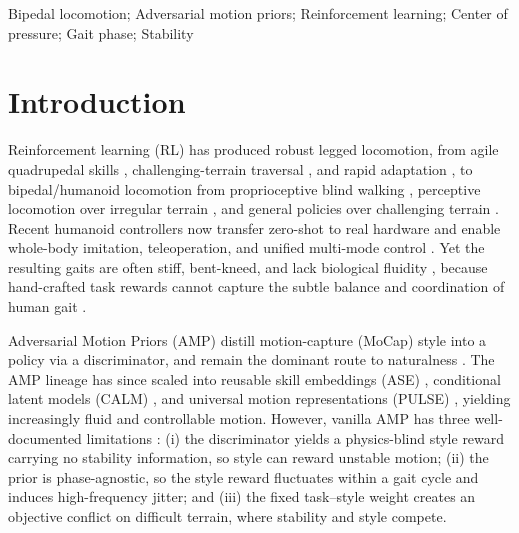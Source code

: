 \documentclass[conference]{IEEEtran}
\begin{document}
\begin{IEEEkeywords}
Bipedal locomotion; Adversarial motion priors; Reinforcement learning; Center of pressure; Gait phase; Stability
\end{IEEEkeywords}

\section{Introduction}
\label{sec:introduction}

Reinforcement learning (RL) has produced robust legged locomotion, from agile quadrupedal skills \cite{hwangbo2019anymal}, challenging-terrain traversal \cite{lee2020challenging}, and rapid adaptation \cite{kumar2021rma}, to bipedal/humanoid locomotion from proprioceptive blind walking \cite{singh2022footsteps}, perceptive locomotion over irregular terrain \cite{vanmarum2023perceptive, song2025gaitadaptive}, and general policies over challenging terrain \cite{radosavovic2024challenging, huang2026coremoe}. Recent humanoid controllers now transfer zero-shot to real hardware \cite{radosavovic2024real} and enable whole-body imitation, teleoperation, and unified multi-mode control \cite{cheng2024exbody, he2024hover, fu2024humanplus, he2024omnih2o}. Yet the resulting gaits are often stiff, bent-kneed, and lack biological fluidity \cite{zhang2025gmp}, because hand-crafted task rewards cannot capture the subtle balance and coordination of human gait \cite{peng2021amp}.

Adversarial Motion Priors (AMP) \cite{peng2021amp} distill motion-capture (MoCap) style into a policy via a discriminator, and remain the dominant route to naturalness \cite{zhang2025gmp, guo2026tgmp}. The AMP lineage has since scaled into reusable skill embeddings (ASE) \cite{peng2022ase}, conditional latent models (CALM) \cite{tessler2023calm}, and universal motion representations (PULSE) \cite{luo2024pulse}, yielding increasingly fluid and controllable motion. However, vanilla AMP has three well-documented limitations \cite{zhang2025gmp, guo2026tgmp}: (i) the discriminator yields a physics-blind style reward carrying no stability information, so style can reward unstable motion; (ii) the prior is phase-agnostic, so the style reward fluctuates within a gait cycle and induces high-frequency jitter; and (iii) the fixed task--style weight creates an objective conflict on difficult terrain, where stability and style compete.
\end{document}
